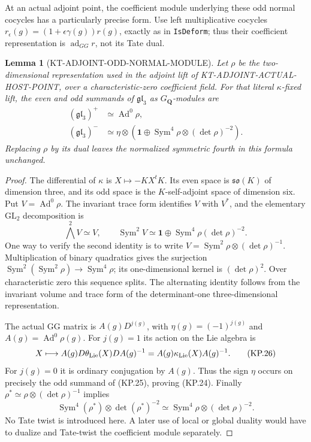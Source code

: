 \documentclass[11pt,a4paper]{article}
\newtheorem{lemma}[theorem]{Lemma}
\theoremstyle{definition}
\begin{document}
At an actual adjoint point, the coefficient module underlying
these odd normal cocycles has a particularly precise form.
Use left multiplicative cocycles
$r_\epsilon(g)=(1+\epsilon\gamma(g))r(g)$, exactly as in
\texttt{IsDeform}; thus their coefficient representation is
$\operatorname{ad}_{GG}r$, not its Tate dual.

\begin{lemma}[KT-ADJOINT-ODD-NORMAL-MODULE]
Let $\rho$ be the two-dimensional representation used in the
adjoint lift of KT-ADJOINT-ACTUAL-HOST-POINT, over a
characteristic-zero coefficient field.  For that literal
$\kappa$-fixed lift, the even and odd summands of
$\mathfrak{gl}_3$ as $G_{\mathbf Q}$-modules are
\[
 \begin{split}
   (\mathfrak{gl}_3)^+&\simeq\operatorname{Ad}^0\rho,\\
   (\mathfrak{gl}_3)^-&\simeq
       \eta\otimes\left(\mathbf1\oplus
                    \operatorname{Sym}^4\rho\otimes(\det\rho)^{-2}\right).
 \end{split}                                                     \tag{KP.24}
\]
Replacing $\rho$ by its dual leaves the normalized symmetric
fourth in this formula unchanged.
\end{lemma}
\begin{proof}
The differential of $\kappa$ is $X\mapsto-KX^tK$.
Its even space is $\mathfrak{so}(K)$ of dimension three,
and its odd space is the $K$-self-adjoint space of dimension
six.  Put $V=\operatorname{Ad}^0\rho$.  The invariant trace
form identifies $V$ with $V^*$, and the elementary
$\mathrm{GL}_2$ decomposition is
\[
 \bigwedge^2 V\simeq V,\qquad
 \operatorname{Sym}^2 V\simeq\mathbf1\oplus
                      \operatorname{Sym}^4\rho(\det\rho)^{-2}.
                                                                  \tag{KP.25}
\]
One way to verify the second identity is to write
$V=\operatorname{Sym}^2\rho\otimes(\det\rho)^{-1}$.
Multiplication of binary quadratics gives the surjection
$\operatorname{Sym}^2(\operatorname{Sym}^2\rho)
\to\operatorname{Sym}^4\rho$; its one-dimensional kernel is
$(\det\rho)^2$.  Over characteristic zero this sequence
splits.  The alternating identity follows from the
invariant volume and trace form of the determinant-one
three-dimensional representation.

The actual GG matrix is $A(g)D^{j(g)}$, with
$\eta(g)=(-1)^{j(g)}$ and $A(g)=\operatorname{Ad}^0\rho(g)$.
For $j(g)=1$ its action on the Lie algebra is
\[
   X\longmapsto A(g)D\theta_{\rm Lie}(X)D A(g)^{-1}
              =A(g)\kappa_{\rm Lie}(X)A(g)^{-1}.             \tag{KP.26}
\]
For $j(g)=0$ it is ordinary conjugation by $A(g)$.  Thus
the sign $\eta$ occurs on precisely the odd summand of
(KP.25), proving (KP.24).  Finally
$\rho^*\simeq\rho\otimes(\det\rho)^{-1}$ implies
\[
 \operatorname{Sym}^4(\rho^*)\otimes\det(\rho^*)^{-2}
       \simeq\operatorname{Sym}^4\rho\otimes(\det\rho)^{-2}.
\]
No Tate twist is introduced here.  A later use of local or
global duality would have to dualize and Tate-twist the
coefficient module separately.
\end{proof}
\end{document}
